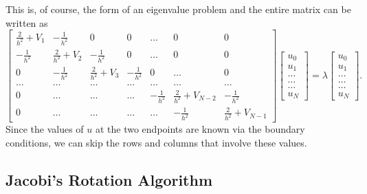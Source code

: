 \documentclass[%
oneside,                 %
final,                   %
10pt]{article}
\begin{document}
This is, of course, the form of an eigenvalue problem and the entire matrix can be written as
\begin{equation}
 \begin{bmatrix} \frac{2}{h^2}+V_1 & -\frac{1}{h^2} & 0   & 0    & \dots  &0     & 0 \\
                                -\frac{1}{h^2} & \frac{2}{h^2}+V_2 & -\frac{1}{h^2} & 0    & \dots  &0     &0 \\
                                0   & -\frac{1}{h^2} & \frac{2}{h^2}+V_3 & -\frac{1}{h^2}  &0       &\dots & 0\\
                                \dots  & \dots & \dots & \dots  &\dots      &\dots & \dots\\
                                0   & \dots & \dots & \dots  &-\frac{1}{h^2}  &\frac{2}{h^2}+V_{N-2} & -\frac{1}{h^2}\\
                                0   & \dots & \dots & \dots  &\dots       &-\frac{1}{h^2} & \frac{2}{h^2}+V_{N-1}
             \end{bmatrix}  \begin{bmatrix} u_{0} \\
                                                              u_{1} \\
                                                              \dots\\ \dots\\ \dots\\
                                                              u_{N}
             \end{bmatrix}=\lambda \begin{bmatrix} u_{0} \\
                                                              u_{1} \\
                                                              \dots\\ \dots\\ \dots\\
                                                              u_{N}
             \end{bmatrix}.  
      \label{eq:sematrix}
\end{equation}
Since the values of $u$ at the two endpoints are known via the boundary conditions, we can skip the rows and columns that involve these values.

\subsection{Jacobi's Rotation Algorithm}
\end{document}
